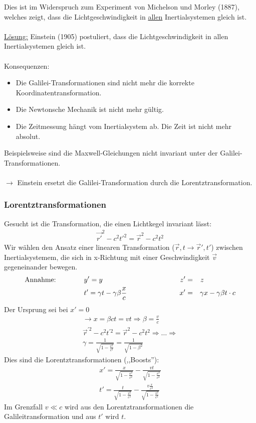 Dies ist im Widerspruch zum Experiment von Michelson und Morley (1887), welches zeigt, dass die Lichtgeschwindigkeit in \underline{allen} Inertialsystemen gleich ist.\\ \\
\underline{Lösung:} Einstein (1905) postuliert, dass die Lichtgeschwindigkeit in allen Inertialsystemen gleich ist.\\ \\
Konsequenzen:
\begin{itemize}
\item Die Galilei-Transformationen sind nicht mehr die korrekte Koordinatentransformation.
\item Die Newtonsche Mechanik ist nicht mehr gültig.
\item Die Zeitmessung hängt vom Inertialsystem ab. Die Zeit ist nicht mehr absolut.
\end{itemize}\vspace{1.5cm}
Beispielsweise sind die Maxwell-Gleichungen nicht invariant unter der Galilei-Transformationen.\\
\\
$\longrightarrow$ Einstein ersetzt die Galilei-Transformation durch die Lorentztransformation.\\

\subsubsection{Lorentztransformationen}
Gesucht ist die Transformation, die einen Lichtkegel invariant lässt:
\begin{eqnarray*}
\vec {r'}^2 - c^2 {t'}^2 = \vec r ^ 2 - c^2t^2
\end{eqnarray*}
Wir wählen den Ansatz einer linearen Transformation ($\vec r, t \rightarrow \vec r ',t'$) zwischen Inertialsystemem, die sich in x-Richtung mit einer Geschwindigkeit $\vec v$ gegeneinander bewegen.
\begin{alignat*}{5}
\text{Annahme:}\qquad \qquad &y' = y \qquad  \qquad \qquad \qquad \qquad  &z' &=& z&\\
&t' = \gamma t- \gamma\beta \frac x c\qquad  &x' &=& \gamma &x - \gamma\beta t \cdot c
\end{alignat*}
Der Ursprung sei bei $x' = 0$
\begin{eqnarray*}
\longrightarrow x = \beta c t  = v t \Rightarrow \boxed{\beta = \frac v c}\\
{\vec r}^{'2} -c^2{t}^{'2} = \vec r^2- c^2t^2 \Rightarrow \dots \Rightarrow\\
\boxed{\gamma = \frac1 {\sqrt{1 - \frac{v^2}{c^2}}} = \frac 1 {\sqrt{1- \beta^2}}}
\end{eqnarray*}
Dies sind die Lorentztransformationen (,,Boosts''):
\begin{eqnarray*}\boxed{
x' = \frac x  {\sqrt{1 - \frac{v^2}{c^2}}} - \frac{v t}{\sqrt{1 - \frac {v^2}{c^2}}}}\\\boxed{
t' = \frac t {\sqrt{1 - \frac{v^2}{c^2}}} - \frac{v \frac x{c^2}}{\sqrt{1 - \frac{v^2}{c^2}}}}
\end{eqnarray*}
Im Grenzfall $v\ll c$ wird aus den Lorentztransformationen die Galileitransformation und aus $t'$ wird $t$.

